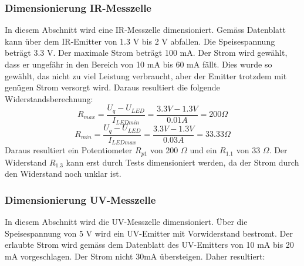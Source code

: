 \documentclass[main.tex]{subfiles} %
\begin{document}


\subsubsection*{Dimensionierung IR-Messzelle}
In diesem Abschnitt wird eine IR-Messzelle dimensioniert. Gemäss Datenblatt kann über dem IR-Emitter von 1.3 V bis 2 V
abfallen. Die Speisespannung beträgt 3.3 V. Der maximale Strom beträgt 100 mA. Der Strom wird gewählt, dass er ungefähr in den
Bereich von 10 mA bis 60 mA fällt. Dies wurde so gewählt, das nicht zu viel Leistung verbraucht, aber der Emitter trotzdem
mit genügen Strom versorgt wird. Daraus resultiert die folgende Widerstandsberechnung:
\[
    R_{max} = \frac{U_q - U_{LED}}{I_{LEDmin}} = \frac{3.3 V - 1.3 V}{0.01A} = 200 \Omega
\]
\[
    R_{min} = \frac{U_q - U_{LED}}{I_{LEDmax}} = \frac{3.3 V - 1.3 V}{0.03A} = 33.33 \Omega
\]
Daraus resultiert ein Potentiometer $R_{p1}$ von 200 $\Omega$ und ein $R_{1.1}$
von 33 $\Omega$. Der Widerstand $R_{1.3}$ kann erst durch Tests dimensioniert
werden, da der Strom durch den Widerstand noch unklar ist.


\subsubsection*{Dimensionierung UV-Messzelle}
In diesem Abschnitt wird die UV-Messzelle dimensioniert.
Über die Speisespannung von 5 V wird ein UV-Emitter mit Vorwiderstand bestromt. Der erlaubte Strom
wird gemäss dem Datenblatt des UV-Emitters von 10 mA bis 20 mA vorgeschlagen. Der Strom nicht
30mA übersteigen. Daher resultiert:
\end{document}
